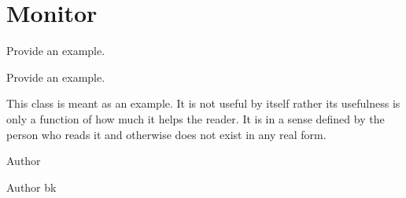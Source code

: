 \hypertarget{group__monitor}{}\section{Monitor}
\label{group__monitor}


Provide an example.  


Provide an example. 

This class is meant as an example. It is not useful by itself rather its usefulness is only a function of how much it helps the reader. It is in a sense defined by the person who reads it and otherwise does not exist in any real form.

\begin{DoxyAuthor}{Author}

\end{DoxyAuthor}
\begin{DoxyParagraph}{Author}
bk 
\end{DoxyParagraph}
